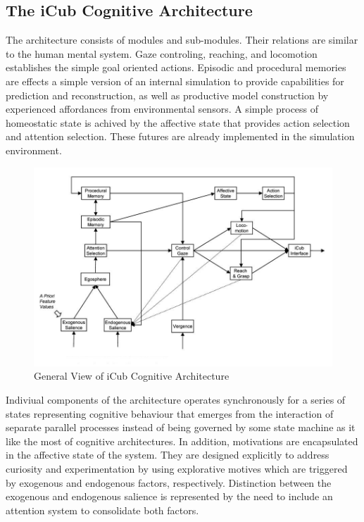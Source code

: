 \documentclass[a4paper, 11pt]{report}
\begin{document}
\subsection{The iCub Cognitive Architecture}
The architecture consists of modules and sub-modules. Their relations are 
similar to the human mental system. Gaze controling, reaching, and locomotion 
establishes the simple goal oriented actions. Episodic and procedural memories 
are effects a simple version of an internal simulation to provide capabilities 
for prediction and reconstruction, as well as productive model construction 
by experienced affordances from environmental sensors. A simple process of 
homeostatic state is achived by the affective state that provides action 
selection and attention selection. These futures are already implemented in the 
simulation environment.
\begin{figure}[h!]
  \centering
  \includegraphics[width=1.0\linewidth]{cognitive_architecture}
  \caption{General View of iCub Cognitive Architecture}
  \label{fig:cognitive_architecture}
 \end{figure}
Indiviual components of the architecture operates synchronously for a series of 
states representing cognitive behaviour that emerges from the interaction of 
separate parallel processes instead of being governed by some state machine as 
it like the most of cognitive architectures. In addition, motivations are 
encapsulated in the affective state of the system. They are designed explicitly 
to address curiosity and experimentation by using explorative motives which are 
triggered by exogenous and endogenous factors, respectively. Distinction 
between the exogenous and endogenous salience is represented by the need to 
include an attention system to consolidate both factors.
\newpage
\end{document}
